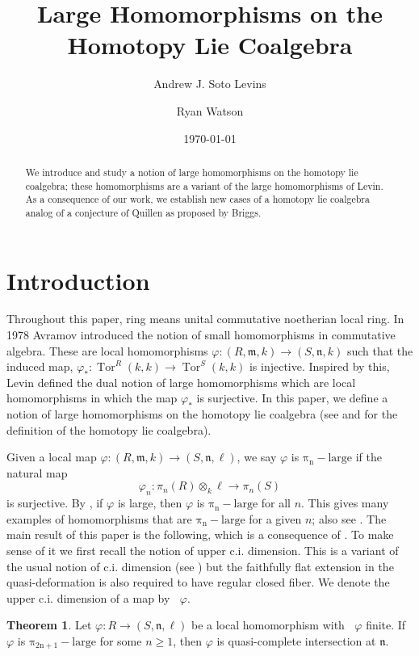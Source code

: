 \documentclass{amsart}
\author{Andrew J. Soto Levins}
\author{Ryan Watson}
\title{Large Homomorphisms on the Homotopy Lie Coalgebra}
\date{\today}
\theoremstyle{definition}
\newtheorem{thmx}{Theorem}[section]
\DeclareMathOperator{\tor}{Tor}
\DeclareMathOperator{\uppercidim}{CI^{*}dim}
\newcommand{\m}{\mathfrak{m}}
\newcommand{\n}{\mathfrak{n}}
\newcommand{\pil}[1]{\operatorname{\pi_{#1}-large}}
\begin{document}
\begin{abstract}
We introduce and study a notion of large homomorphisms on the homotopy lie coalgebra; these homomorphisms are a variant of the large homomorphisms of Levin. As a consequence of our work, we establish new cases of a homotopy lie coalgebra analog of a conjecture of Quillen as proposed by Briggs. 
\end{abstract}

\maketitle
\section*{Introduction}
Throughout this paper, ring means unital commutative noetherian local ring. In 1978 Avramov \cite{Avramov:1978} introduced the notion of small homomorphisms in commutative algebra. These are local homomorphisms $\varphi\colon (R,\m,k) \to (S,\n,k)$ such that the induced map, $\varphi_*\colon \tor^R(k,k) \to \tor^S(k,k)$ is injective. Inspired by this, Levin \cite{Levin:1980} defined the dual notion of large homomorphisms which are local homomorphisms in which the map $\varphi_*$ is surjective. In this paper, we define a notion of large homomorphisms on the homotopy lie coalgebra (see  and  for the definition of the homotopy lie coalgebra).

Given a local map $\varphi\colon (R,\m,k)\rightarrow (S,\n,\ell)$, we say $\varphi$ is $\pil{n}$ if the natural map
\[\varphi_{n}\colon \pi_{n}(R)\otimes_{k}\ell\rightarrow \pi_{n}(S)\]
is surjective. By \cite[Example 7]{Briggs:2018}, if $\varphi$ is large, then $\varphi$ is $\pil{n}$ for all $n$. This gives many examples of homomorphisms that are $\pil{n}$ for a given $n$; also see \cite{Gheibi/Takahashi:2021}. The main result of this paper is the following, which is a consequence of . To make sense of it we first recall the notion of upper c.i. dimension. This is a variant of the usual notion of c.i. dimension (see \cite{Avramov/Gasharov/Peeva:1997,Majadas:2016}) but the faithfully flat extension in the quasi-deformation is also required to have regular closed fiber. We denote the upper c.i. dimension of a map by $\uppercidim{\varphi}$.


\begin{thmx} \label{T_MainTheorem} Let $\varphi\colon R\rightarrow (S,\n,\ell)$ be a local homomorphism with $\uppercidim{\varphi}$ finite. If $\varphi$ is $\pil{2n+1}$ for some $n\geq 1$, then $\varphi$ is quasi-complete intersection at $\n$.
\end{thmx}
\end{document}

